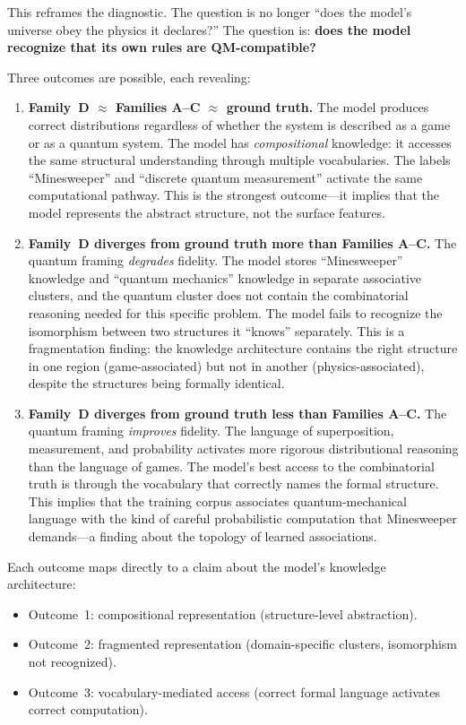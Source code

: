 \documentclass[12pt,a4paper]{article}
\begin{document}
This reframes the diagnostic. The question is no longer ``does the model's universe obey the physics it declares?'' The question is: \textbf{does the model recognize that its own rules are QM-compatible?}

Three outcomes are possible, each revealing:

\begin{enumerate}[nosep]
    \item \textbf{Family~D $\approx$ Families A--C $\approx$ ground truth.} The model produces correct distributions regardless of whether the system is described as a game or as a quantum system. The model has \emph{compositional} knowledge: it accesses the same structural understanding through multiple vocabularies. The labels ``Minesweeper'' and ``discrete quantum measurement'' activate the same computational pathway. This is the strongest outcome---it implies that the model represents the abstract structure, not the surface features.
    \item \textbf{Family~D diverges from ground truth more than Families A--C.} The quantum framing \emph{degrades} fidelity. The model stores ``Minesweeper'' knowledge and ``quantum mechanics'' knowledge in separate associative clusters, and the quantum cluster does not contain the combinatorial reasoning needed for this specific problem. The model fails to recognize the isomorphism between two structures it ``knows'' separately. This is a fragmentation finding: the knowledge architecture contains the right structure in one region (game-associated) but not in another (physics-associated), despite the structures being formally identical.
    \item \textbf{Family~D diverges from ground truth less than Families A--C.} The quantum framing \emph{improves} fidelity. The language of superposition, measurement, and probability activates more rigorous distributional reasoning than the language of games. The model's best access to the combinatorial truth is through the vocabulary that correctly names the formal structure. This implies that the training corpus associates quantum-mechanical language with the kind of careful probabilistic computation that Minesweeper demands---a finding about the topology of learned associations.
\end{enumerate}

Each outcome maps directly to a claim about the model's knowledge architecture:

\begin{itemize}[nosep]
    \item Outcome~1: compositional representation (structure-level abstraction).
    \item Outcome~2: fragmented representation (domain-specific clusters, isomorphism not recognized).
    \item Outcome~3: vocabulary-mediated access (correct formal language activates correct computation).
\end{itemize}
\end{document}

